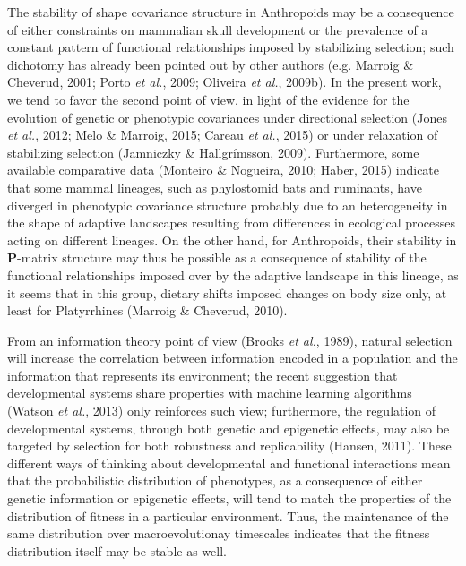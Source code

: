 \documentclass[12pt,twoside]{report}
\begin{document}
The stability of shape covariance structure in Anthropoids may be a
consequence of either constraints on mammalian skull development or the
prevalence of a constant pattern of functional relationships imposed by
stabilizing selection; such dichotomy has already been pointed out by
other authors (e.g. Marroig \& Cheverud, 2001; Porto \emph{et al.},
2009; Oliveira \emph{et al.}, 2009b). In the present work, we tend to
favor the second point of view, in light of the evidence for the
evolution of genetic or phenotypic covariances under directional
selection (Jones \emph{et al.}, 2012; Melo \& Marroig, 2015; Careau
\emph{et al.}, 2015) or under relaxation of stabilizing selection
(Jamniczky \& Hallgrímsson, 2009). Furthermore, some available
comparative data (Monteiro \& Nogueira, 2010; Haber, 2015) indicate that
some mammal lineages, such as phylostomid bats and ruminants, have
diverged in phenotypic covariance structure probably due to an
heterogeneity in the shape of adaptive landscapes resulting from
differences in ecological processes acting on different lineages. On the
other hand, for Anthropoids, their stability in $\mathbf{P}$-matrix
structure may thus be possible as a consequence of stability of the
functional relationships imposed over by the adaptive landscape in this
lineage, as it seems that in this group, dietary shifts imposed changes
on body size only, at least for Platyrrhines (Marroig \& Cheverud,
2010).

From an information theory point of view (Brooks \emph{et al.}, 1989),
natural selection will increase the correlation between information
encoded in a population and the information that represents its
environment; the recent suggestion that developmental systems share
properties with machine learning algorithms (Watson \emph{et al.}, 2013)
only reinforces such view; furthermore, the regulation of developmental
systems, through both genetic and epigenetic effects, may also be
targeted by selection for both robustness and replicability (Hansen,
2011). These different ways of thinking about developmental and
functional interactions mean that the probabilistic distribution of
phenotypes, as a consequence of either genetic information or epigenetic
effects, will tend to match the properties of the distribution of
fitness in a particular environment. Thus, the maintenance of the same
distribution over macroevolutionay timescales indicates that the fitness
distribution itself may be stable as well.

\def\sectionautorefname{Seção} \def\chapterautorefname{Capítulo}
\def\figureautorefname{Figura} \def\tableautorefname{Tabela}
\end{document}
